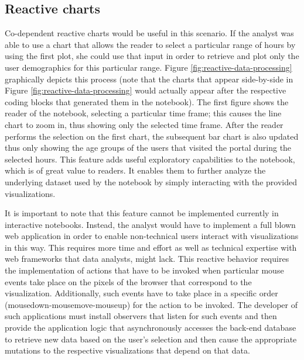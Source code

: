 \subsection*{Reactive charts} Co-dependent reactive charts would be useful in this scenario. If the analyst was able to use a chart that allows the reader to select a particular range of hours by using the first plot, she could use that input in order to retrieve and plot only the user demographics for this particular range.  Figure \ref{fig:reactive-data-processing} graphically depicts this process (note that the charts that appear side-by-side in Figure \ref{fig:reactive-data-processing} would actually appear after the respective coding blocks that generated them in the notebook). The first figure shows the reader of the notebook, selecting a particular time frame; this causes the line chart to zoom in, thus showing only the selected time frame. After the reader performs the selection on the first chart, the subsequent bar chart is also updated thus only showing the age groups of the users that visited the portal during the selected hours. This feature adds useful exploratory capabilities to the notebook, which is of great value to readers. It enables them to further analyze the underlying dataset used by the notebook by simply interacting with the provided visualizations. 

It is important to note that this feature cannot be implemented currently in interactive notebooks. Instead, the analyst would have to implement a full blown web application in order to enable non-technical users interact with visualizations in this way. This requires more time and effort as well as technical expertise with web frameworks that data analysts, might lack. This reactive behavior requires the implementation of actions that have to be invoked when particular mouse events take place on the pixels of the browser that correspond to the visualization. Additionally, such events have to take place in a specific order (mousedown-mousemove-mouseup) for the action to be invoked. The developer of such applications must install observers that listen for such events and then provide the application logic that asynchronously accesses the back-end database to retrieve new data based on the user's selection and then cause the appropriate mutations to the respective visualizations that depend on that data. 


